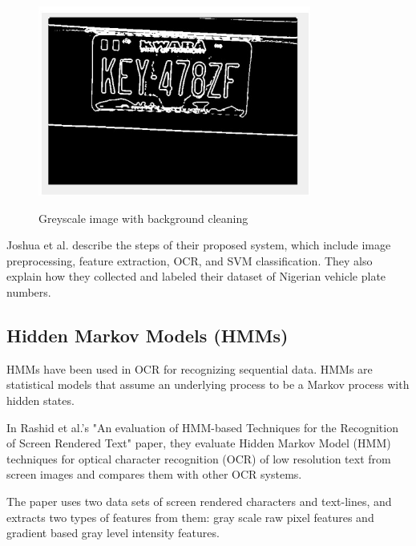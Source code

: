 \begin{figure}[ht]
    \centering
    \includegraphics[width=0.8\textwidth]{Figures/SVM_Joshua.jpg}
    \caption[Development of an Image Processing Technique for Vehicle Classification using OCR and SVM]{Greyscale image with background cleaning}\cite{joshuaDevelopmentImageProcessing2023}
    \label{fig:Joshua SVM Paper}
\end{figure}

Joshua et al. describe the steps of their proposed system, which include image preprocessing, feature extraction, OCR, and SVM classification. They also explain how they collected and labeled their dataset of Nigerian vehicle plate numbers.

\newpage

\subsection{Hidden Markov Models (HMMs)}

HMMs have been used in OCR for recognizing sequential data. HMMs are statistical models that assume an underlying process to be a Markov process with hidden states.


In Rashid et al.'s "An evaluation of HMM-based Techniques for the Recognition of Screen Rendered Text" paper, they evaluate Hidden Markov Model (HMM) techniques for optical character recognition (OCR) of low resolution text from screen images and compares them with other OCR systems.

The paper uses two data sets of screen rendered characters and text-lines, and extracts two types of features from them: gray scale raw pixel features and gradient based gray level intensity features.


